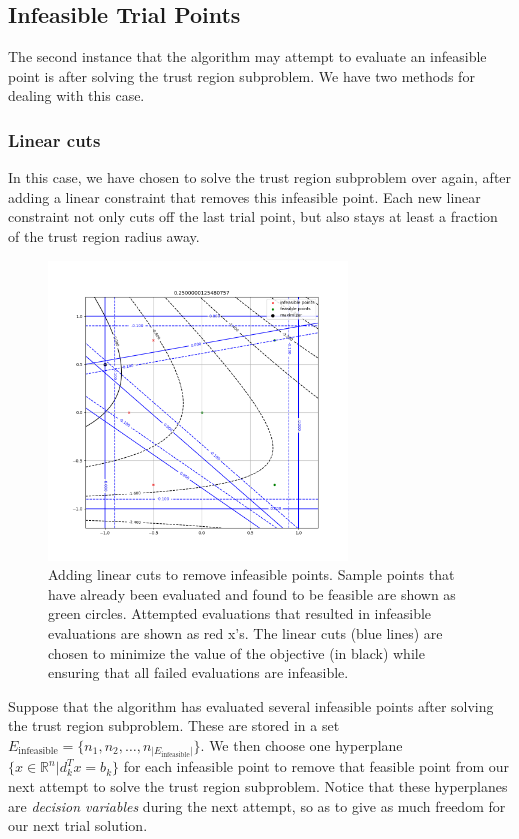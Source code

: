 \documentclass{article}
\theoremstyle{case}
\numberwithin{theorem}{subsection}
\newcommand{\Rn}{\mathbb R^n}
\newcommand{\trsinfset}{{E_\textrm{infeasible}}}
\begin{document}
\subsection{Infeasible Trial Points}
\label{convex_model_reduction}

The second instance that the algorithm may attempt to evaluate an infeasible point is after solving the trust region subproblem.
We have two methods for dealing with this case.

\subsubsection{Linear cuts}
In this case, we have chosen to solve the trust region subproblem over again, after adding a linear constraint that removes this infeasible point.
Each new linear constraint not only cuts off the last trial point, but also stays at least a fraction of the trust region radius away.

\begin{figure}[h]
    \centering
    \includegraphics[width=300px]{images/pyomo_cut_solution.png}
    \caption{
		Adding linear cuts to remove infeasible points.
		Sample points that have already been evaluated and found to be feasible are shown as green circles.
		Attempted evaluations that resulted in infeasible evaluations are shown as red x's.
		The linear cuts (blue lines) are chosen to minimize the value of the objective (in black) while ensuring that all failed evaluations are infeasible.
	}
    \label{pvip}
\end{figure}


Suppose that the algorithm has evaluated several infeasible points after solving the trust region subproblem.
These are stored in a set $\trsinfset = \{n_1, n_2, \ldots, n_{|\trsinfset|}\}$.
We then choose one hyperplane $\{x \in \Rn | d_k^Tx = b_k\}$ for each infeasible point to remove that feasible point from our next attempt to solve the trust region subproblem.
Notice that these hyperplanes are \emph{decision variables} during the next attempt, so as to give as much freedom for our next trial solution.
\end{document}
